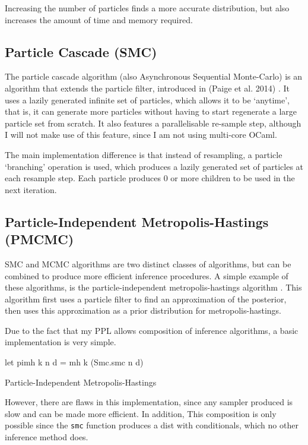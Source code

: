 Increasing the number of particles finds a more accurate distribution, but also increases the amount of time and memory required.
	
\subsection{Particle Cascade (SMC)} \label{sec:pc}
The particle cascade algorithm (also Asynchronous Sequential Monte-Carlo) is an algorithm that extends the particle filter, introduced in (Paige et al. 2014) \cite{paige2014asynchronous}. It uses a lazily generated infinite set of particles, which allows it to be `anytime', that is, it can generate more particles without having to start regenerate a large particle set from scratch. It also features a parallelisable re-sample step, although I will not make use of this feature, since I am not using multi-core OCaml.
	
The main implementation difference is that instead of resampling, a particle `branching' operation is used, which produces a lazily generated set of particles at each resample step. Each particle produces 0 or more children to be used in the next iteration.
	
\subsection{Particle-Independent Metropolis-Hastings (PMCMC)} \label{sec:pimh}
	
SMC and MCMC algorithms are two distinct classes of algorithms, but can be combined to produce more efficient inference procedures. A simple example of these algorithms, is the particle-independent metropolis-hastings algorithm \cite{pmcmc}. This algorithm first uses a particle filter to find an approximation of the posterior, then uses this approximation as a prior distribution for metropolis-hastings.
	
Due to the fact that my PPL allows composition of inference algorithms, a basic implementation is very simple.
	
\begin{listing}
\begin{ocamlcode-in}
let pimh k n d = mh k (Smc.smc n d)
\end{ocamlcode-in}
\caption{Particle-Independent Metropolis-Hastings}
\end{listing}
However, there are flaws in this implementation, since any sampler produced is slow and can be made more efficient. In addition, This composition is only possible since the \texttt{smc} function produces a dist with conditionals, which no other inference method does.

